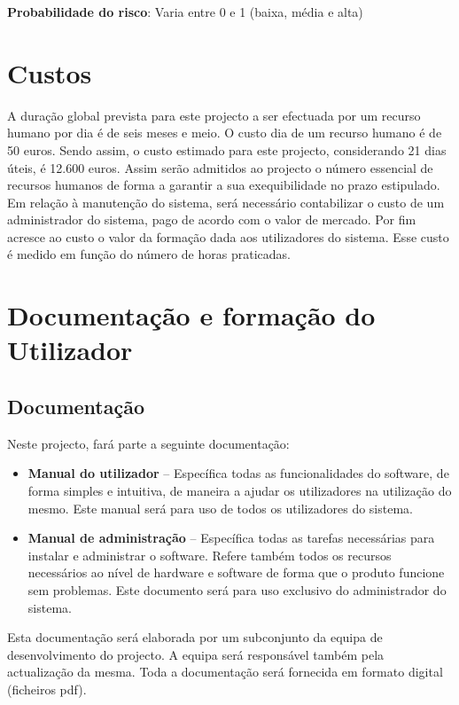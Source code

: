 \textbf{Probabilidade do risco}: Varia entre 0 e 1 (baixa, média e alta)
 
\section{Custos}
A duração global prevista para este projecto a ser efectuada por um recurso humano por dia é de seis meses e meio. O custo dia de um recurso humano é de 50 euros. Sendo assim, o custo estimado para este projecto, considerando 21 dias úteis, é 12.600 euros. Assim serão admitidos ao projecto o número essencial de recursos humanos de forma a garantir a sua exequibilidade no prazo estipulado. 
Em relação à manutenção do sistema, será necessário contabilizar o custo de um administrador do sistema, pago de acordo com o valor de mercado.
Por fim acresce ao custo o valor da formação dada aos utilizadores do sistema. Esse custo é medido em função do número de horas praticadas.

\section{Documentação e formação do Utilizador}
\subsection{Documentação}
Neste projecto, fará parte a seguinte documentação:

\begin{itemize}
\item \textbf{Manual do utilizador} – Específica todas as funcionalidades do software, de forma simples e intuitiva, de maneira a ajudar os utilizadores na utilização do mesmo. Este manual será para uso de todos os utilizadores do sistema.

\item \textbf{Manual de administração} – Específica todas as tarefas necessárias para instalar e administrar o software. Refere também todos os recursos necessários ao nível de hardware e software de forma que o produto funcione sem problemas. Este documento será para uso exclusivo do administrador do sistema.
\end{itemize}

Esta documentação será elaborada por um subconjunto da equipa de desenvolvimento do projecto. A equipa será responsável também pela actualização da mesma. Toda a documentação será fornecida em formato digital (ficheiros pdf). 

